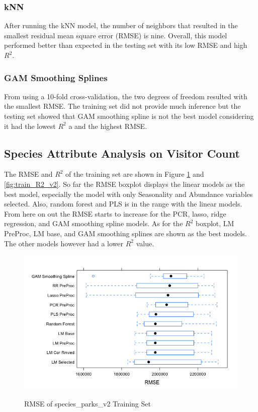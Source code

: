 \documentclass[stu, floatsintext, 11pt]{apa7}
\begin{document}
\subsubsection{kNN}
After running the kNN model, the number of neighbors that resulted in the smallest residual mean square error (RMSE) is nine. Overall, this model performed better than expected in the testing set with its low RMSE and high $R^2$.

\subsubsection{GAM Smoothing Splines}
From using a 10-fold cross-validation, the two degrees of freedom resulted with the smallest RMSE. The training set did not provide much inference but the testing set showed that GAM smoothing spline is not the best model considering it had the lowest $R^2$ a and the highest RMSE.

\subsection{Species Attribute Analysis on Visitor Count}
The RMSE and $R^2$ of the training set are shown in Figure \ref{fig:train_RMSE_v2} and \ref{fig:train_R2_v2}. So far the RMSE boxplot displays the linear models as the best model, especially the model with only Seasonality and Abundance variables selected. Also, random forest and PLS is in the range with the linear models. From here on out the RMSE starts to increase for the PCR, lasso, ridge regression, and GAM smoothing spline models. As for the $R^2$ boxplot, LM PreProc, LM base, and GAM smoothing splines are shown as the best models. The other models however had a lower $R^2$ value.

\begin{figure}[h!]
\centering
\caption{RMSE of species\_parks\_v2 Training Set}
\includegraphics[scale=0.6]{images/train_RMSE_v2.png}
\label{fig:train_RMSE_v2}
\end{figure}
\end{document}
